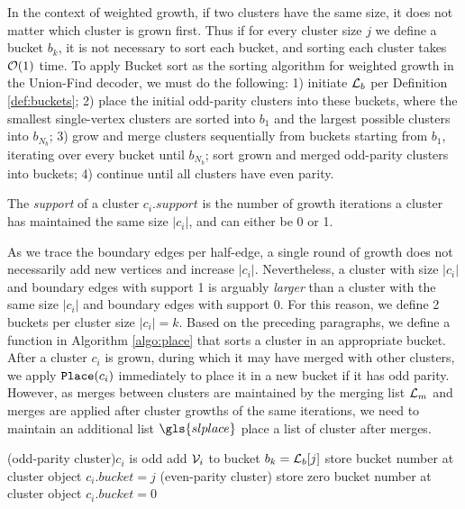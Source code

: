 In the context of weighted growth, if two clusters have the same size, it does not matter which cluster is grown first. Thus if for every cluster size $j$ we define a bucket $b_k$, it is not necessary to sort each bucket, and sorting each cluster takes $\mathcal{O}(1)$ time. To apply Bucket sort as the sorting algorithm for weighted growth in the Union-Find decoder, we must do the following: 1) initiate $\mathcal{L}_b$ per Definition \ref{def:buckets}; 2) place the initial odd-parity clusters into these buckets, where the smallest single-vertex clusters are sorted into $b_1$ and the largest possible clusters into $b_{N_b}$; 3) grow and merge clusters sequentially from buckets starting from $b_1$, iterating over every bucket until $b_{N_b}$; sort grown and merged odd-parity clusters into buckets; 4) continue until all clusters have even parity. 
\begin{definition}\label{def:clustersupport}
  The \emph{support} of a cluster $c_i.support$ is the number of growth iterations a cluster has maintained the same size $|c_i|$, and can either be 0 or 1. 
\end{definition}
As we trace the boundary edges per half-edge, a single round of growth does not necessarily add new vertices and increase $|c_i|$. Nevertheless, a cluster with size $|c_i|$ and boundary edges with support 1 is arguably \emph{larger} than a cluster with the same size $|c_i|$ and boundary edges with support 0. For this reason, we define 2 buckets per cluster size $|c_i|=k$. Based on the preceding paragraphs, we define a function  in Algorithm \ref{algo:place} that sorts a cluster in an appropriate bucket. After a cluster $c_i$ is grown, during which it may have merged with other clusters, we apply $\texttt{Place}(c_i)$ immediately to place it in a new bucket if it has odd parity. However, as merges between clusters are maintained by the merging list $\mathcal{L}_m$ and merges are applied after cluster growths of the same iterations, we need to maintain an additional list $\gls{slplace}$ place a list of cluster after merges.  

\begin{algorithm}[h]
  \BlankLine
  \BlankLine

  \uIf(odd-parity cluster){$c_i$ is odd}{
    add $\mathcal{V}_i$ to bucket $b_k = \mathcal{L}_b[j]$\;
    store bucket number at cluster object $c_i.bucket = j$\;
  }
  \Else(even-parity cluster){
    store zero bucket number at cluster object $c_i.bucket = 0$\;
  }
  \BlankLine
  \caption{}\label{algo:place}
\end{algorithm}

